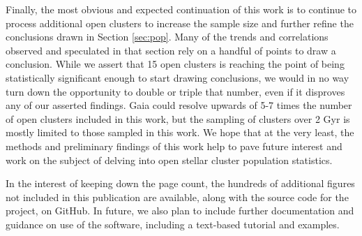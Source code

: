 \documentclass[onecolumn,table,xcdraw,super]{aastex631}
\begin{document}
Finally, the most obvious and expected continuation of this work is to continue to process additional open clusters to increase the sample size and further refine the conclusions drawn in Section \ref{sec:pop}. Many of the trends and correlations observed and speculated in that section rely on a handful of points to draw a conclusion. While we assert that 15 open clusters is reaching the point of being statistically significant enough to start drawing conclusions, we would in no way turn down the opportunity to double or triple that number, even if it disproves any of our asserted findings. Gaia could resolve upwards of 5-7 times the number of open clusters included in this work, but the sampling of clusters over 2 Gyr is mostly limited to those sampled in this work. We hope that at the very least, the methods and preliminary findings of this work help to pave future interest and work on the subject of delving into open stellar cluster population statistics.

{}
\nocite{*}


\newpage{}
\appendix{}
In the interest of keeping down the page count, the hundreds of additional figures not included in this publication are available, along with the source code for the project, on GitHub. In future, we also plan to include further documentation and guidance on use of the software, including a text-based tutorial and examples. 

\end{document}
